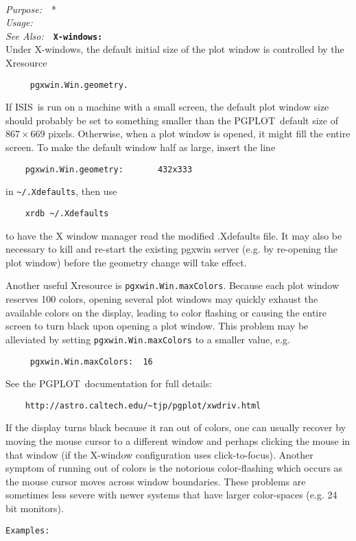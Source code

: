 \documentclass{book}
\makeatletter
\newif\ifpdf
\newcommand{\isisx}{{\sc ISIS~}}
\newcommand{\pgplot}{{\sc PGPLOT}}
\newenvironment{isisfunction}[4]%
{\index{{#1}@{\tt #1}}%
  \ifpdf
  \else
     \addcontentsline{toc}{subsection}{{#1} -- {#2}}
  \fi
  \vbox{
          \vspace*{\baselineskip}
          {\LARGE\tt #1}\vspace*{\baselineskip}\\
          {{\it Purpose:}~~{#2}}\\
          {{\it Usage:}~~{\tt #3}}\\
          {{\it See Also:}~~{\tt #4}}
       }
}%
{ }
\makeatother
\begin{document}
{\begin{isisfunction}
\vspace*{\baselineskip}
{\bf X-windows:~~}\\
Under X-windows, the default initial size of the plot
window is controlled by the Xresource
\begin{verbatim}
     pgxwin.Win.geometry.
\end{verbatim}
If \isisx is run on a machine with a small screen, the default
plot window size should probably be set to something smaller than the
\pgplot\ default size of $867\times 669$ pixels.  Otherwise, when a plot
window is opened, it might fill the entire screen. To make the default
window half as large, insert the line
\begin{verbatim}
    pgxwin.Win.geometry:       432x333
\end{verbatim}
in \verb|~/.Xdefaults|, then use
\begin{verbatim}
    xrdb ~/.Xdefaults
\end{verbatim}
to have the X window manager read the modified .Xdefaults file. It may also
be necessary to kill and re-start the existing pgxwin server (e.g. by
re-opening the plot window) before the geometry change will take effect.

Another useful Xresource is {\tt pgxwin.Win.maxColors}. Because each plot
window reserves 100 colors, opening several plot windows may quickly exhaust
the available colors on the display, leading to color flashing or causing
the entire screen to turn black upon opening a plot window. This problem may
be alleviated by setting {\tt pgxwin.Win.maxColors} to a smaller value, e.g.
\begin{verbatim}
     pgxwin.Win.maxColors:  16
\end{verbatim}
See the \pgplot\ documentation for full details:
\begin{verbatim}
    http://astro.caltech.edu/~tjp/pgplot/xwdriv.html
\end{verbatim}
If the display turns black because it ran out of colors, one can usually
recover by moving the mouse cursor to a different window and perhaps
clicking the mouse in that window (if the X-window configuration uses
click-to-focus).  Another symptom of running out of colors is the notorious
color-flashing which occurs as the mouse cursor moves across window
boundaries.  These problems are sometimes less severe with newer systems
that have larger color-spaces (e.g. 24 bit monitors).

\begin{verbatim}
Examples:


\end{verbatim}
\end{isisfunction}}
\end{document}
